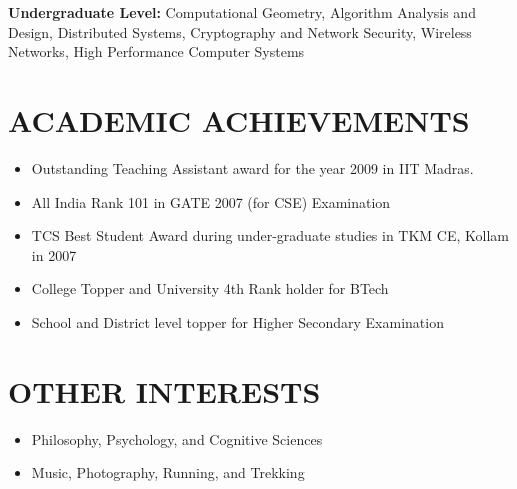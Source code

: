\documentclass{res}
\begin{document}
\begin{resume}
\textbf{Undergraduate Level:}
Computational Geometry, 
Algorithm Analysis and Design, 
Distributed Systems, 
Cryptography and Network Security, 
Wireless Networks, 
High Performance Computer Systems

\section{ACADEMIC ACHIEVEMENTS}          
\begin{itemize}
\item Outstanding Teaching Assistant award for the year 2009 in IIT Madras.
\item All India Rank 101 in GATE 2007 (for CSE) Examination
\item TCS Best Student Award during under-graduate studies in TKM CE, Kollam in 2007
\item College Topper and University 4th Rank holder for BTech
\item School and District level topper for Higher Secondary Examination

\end{itemize}

\section{OTHER INTERESTS}

\begin{itemize}
\item Philosophy, Psychology, and Cognitive Sciences
\item Music, Photography, Running, and Trekking 

\end{itemize} 
\end{resume}
\end{document}
